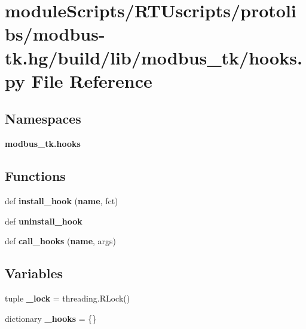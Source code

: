 \section{module\+Scripts/\+R\+T\+Uscripts/protolibs/modbus-\/tk.hg/build/lib/modbus\+\_\+tk/hooks.py File Reference}
\label{modbus-tk_8hg_2build_2lib_2modbus__tk_2hooks_8py}
\subsection*{Namespaces}
\begin{DoxyCompactItemize}
\item 
 {\bf modbus\+\_\+tk.\+hooks}
\end{DoxyCompactItemize}
\subsection*{Functions}
\begin{DoxyCompactItemize}
\item 
def {\bf install\+\_\+hook} ({\bf name}, fct)
\item 
def {\bf uninstall\+\_\+hook}
\item 
def {\bf call\+\_\+hooks} ({\bf name}, args)
\end{DoxyCompactItemize}
\subsection*{Variables}
\begin{DoxyCompactItemize}
\item 
tuple {\bf \+\_\+lock} = threading.\+R\+Lock()
\item 
dictionary {\bf \+\_\+hooks} = \{\}
\end{DoxyCompactItemize}
